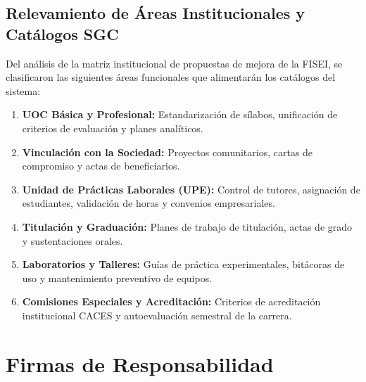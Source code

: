 \documentclass[12pt,a4paper]{article}
\begin{document}
\subsection{Relevamiento de Áreas Institucionales y Catálogos SGC}
Del análisis de la matriz institucional de propuestas de mejora de la FISEI, se clasificaron las siguientes áreas funcionales que alimentarán los catálogos del sistema:
\begin{enumerate}[leftmargin=1.5em, itemsep=2pt]
    \item \textbf{UOC Básica y Profesional:} Estandarización de sílabos, unificación de criterios de evaluación y planes analíticos.
    \item \textbf{Vinculación con la Sociedad:} Proyectos comunitarios, cartas de compromiso y actas de beneficiarios.
    \item \textbf{Unidad de Prácticas Laborales (UPE):} Control de tutores, asignación de estudiantes, validación de horas y convenios empresariales.
    \item \textbf{Titulación y Graduación:} Planes de trabajo de titulación, actas de grado y sustentaciones orales.
    \item \textbf{Laboratorios y Talleres:} Guías de práctica experimentales, bitácoras de uso y mantenimiento preventivo de equipos.
    \item \textbf{Comisiones Especiales y Acreditación:} Criterios de acreditación institucional CACES y autoevaluación semestral de la carrera.
\end{enumerate}

\vspace{0.3cm}

\section{Firmas de Responsabilidad}
\end{document}
